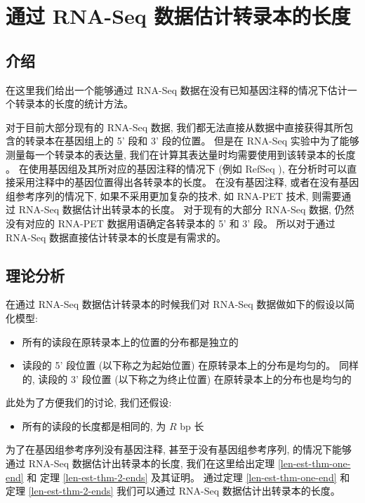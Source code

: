 \chapter{通过 RNA-Seq 数据估计转录本的长度}
\label{chap-lenest}

\section{介绍}
在这里我们给出一个能够通过 RNA-Seq 数据在没有已知基因注释的情况下估计一个转录本的长度的统计方法。 

对于目前大部分现有的 RNA-Seq 数据, 
我们都无法直接从数据中直接获得其所包含的转录本在基因组上的 5' 段和 3' 段的位置。 
但是在 RNA-Seq 实验中为了能够测量每一个转录本的表达量, 
我们在计算其表达量时均需要使用到该转录本的长度 
\cite{mortazavi2008mapping, Jiang15042009, cufflinks.2010}。 
在使用基因组及其所对应的基因注释的情况下 (例如 RefSeq \cite{_refseq}), 
在分析时可以直接采用注释中的基因位置得出各转录本的长度。 
在没有基因注释, 或者在没有基因组参考序列的情况下, 
如果不采用更加复杂的技术, 如 RNA-PET \cite{Fullwood01042009} 技术, 
则需要通过 RNA-Seq 数据估计出转录本的长度。 对于现有的大部分 RNA-Seq 数据, 
仍然没有对应的 RNA-PET 数据用语确定各转录本的 5' 和 3' 段。 
所以对于通过 RNA-Seq 数据直接估计转录本的长度是有需求的。 

\section{理论分析}
在通过 RNA-Seq 数据估计转录本的时候我们对 RNA-Seq 数据做如下的假设以简化模型: 
\begin{itemize}
\item 所有的读段在原转录本上的位置的分布都是独立的 

\item 读段的 5' 段位置 (以下称之为起始位置) 在原转录本上的分布是均匀的。 
同样的, 读段的 3' 段位置 (以下称之为终止位置) 在原转录本上的分布也是均匀的 
\end{itemize}

此处为了方便我们的讨论, 我们还假设: 
\begin{itemize}
\item 所有的读段的长度都是相同的, 为 $R$ bp 长
\end{itemize}

为了在基因组参考序列没有基因注释, 甚至于没有基因组参考序列, 
的情况下能够通过 RNA-Seq 数据估计出转录本的长度, 
我们在这里给出定理 \ref{len-est-thm-one-end} 和 
定理 \ref{len-est-thm-2-ends} 及其证明。 
通过定理 \ref{len-est-thm-one-end} 和 
定理 \ref{len-est-thm-2-ends} 
我们可以通过 RNA-Seq 数据估计出转录本的长度。 

